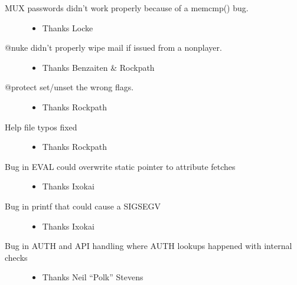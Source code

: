 \documentclass[letterpaper,10pt,english]{sphinxmanual}
\begin{document}
\label{\detokenize{changelog:rhostmush-4-0}}\label{\detokenize{changelog:changelog-4-0}}\begin{description}
\item[{MUX passwords didn’t work properly because of a memcmp() bug.}] \leavevmode\begin{itemize}
\item {} 
\sphinxAtStartPar
Thanks Locke

\end{itemize}

\item[{@nuke didn’t properly wipe mail if issued from a non\sphinxhyphen{}player.}] \leavevmode\begin{itemize}
\item {} 
\sphinxAtStartPar
Thanks Benzaiten \& Rockpath

\end{itemize}

\item[{@protect set/unset the wrong flags.}] \leavevmode\begin{itemize}
\item {} 
\sphinxAtStartPar
Thanks Rockpath

\end{itemize}

\item[{Help file typos fixed}] \leavevmode\begin{itemize}
\item {} 
\sphinxAtStartPar
Thanks Rockpath

\end{itemize}

\item[{Bug in EVAL could overwrite static pointer to attribute fetches}] \leavevmode\begin{itemize}
\item {} 
\sphinxAtStartPar
Thanks Ixokai

\end{itemize}

\item[{Bug in printf that could cause a SIGSEGV}] \leavevmode\begin{itemize}
\item {} 
\sphinxAtStartPar
Thanks Ixokai

\end{itemize}

\item[{Bug in AUTH and API handling where AUTH lookups happened with internal checks}] \leavevmode\begin{itemize}
\item {} 
\sphinxAtStartPar
Thanks Neil “Polk” Stevens


\end{itemize}
\end{description}
\end{document}
